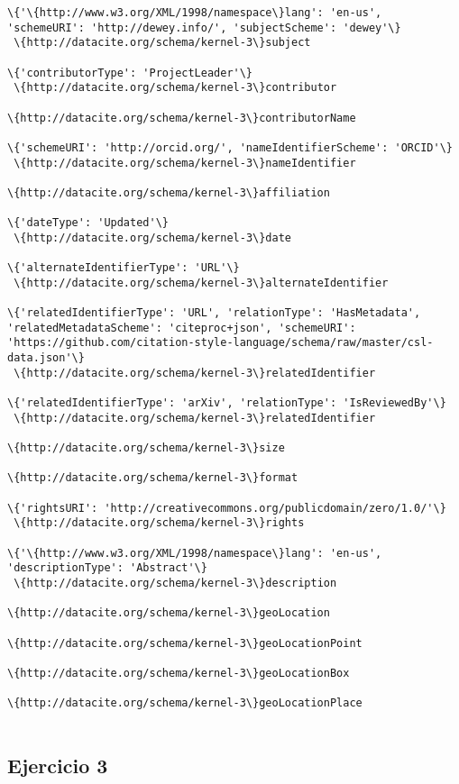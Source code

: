 \documentclass[11pt]{article}
\begin{document}
\begin{Verbatim}[commandchars=\\\{\}]
\{'\{http://www.w3.org/XML/1998/namespace\}lang': 'en-us', 'schemeURI': 'http://dewey.info/', 'subjectScheme': 'dewey'\} 
 \{http://datacite.org/schema/kernel-3\}subject 

\{'contributorType': 'ProjectLeader'\} 
 \{http://datacite.org/schema/kernel-3\}contributor 

\{http://datacite.org/schema/kernel-3\}contributorName 

\{'schemeURI': 'http://orcid.org/', 'nameIdentifierScheme': 'ORCID'\} 
 \{http://datacite.org/schema/kernel-3\}nameIdentifier 

\{http://datacite.org/schema/kernel-3\}affiliation 

\{'dateType': 'Updated'\} 
 \{http://datacite.org/schema/kernel-3\}date 

\{'alternateIdentifierType': 'URL'\} 
 \{http://datacite.org/schema/kernel-3\}alternateIdentifier 

\{'relatedIdentifierType': 'URL', 'relationType': 'HasMetadata', 'relatedMetadataScheme': 'citeproc+json', 'schemeURI': 'https://github.com/citation-style-language/schema/raw/master/csl-data.json'\} 
 \{http://datacite.org/schema/kernel-3\}relatedIdentifier 

\{'relatedIdentifierType': 'arXiv', 'relationType': 'IsReviewedBy'\} 
 \{http://datacite.org/schema/kernel-3\}relatedIdentifier 

\{http://datacite.org/schema/kernel-3\}size 

\{http://datacite.org/schema/kernel-3\}format 

\{'rightsURI': 'http://creativecommons.org/publicdomain/zero/1.0/'\} 
 \{http://datacite.org/schema/kernel-3\}rights 

\{'\{http://www.w3.org/XML/1998/namespace\}lang': 'en-us', 'descriptionType': 'Abstract'\} 
 \{http://datacite.org/schema/kernel-3\}description 

\{http://datacite.org/schema/kernel-3\}geoLocation 

\{http://datacite.org/schema/kernel-3\}geoLocationPoint 

\{http://datacite.org/schema/kernel-3\}geoLocationBox 

\{http://datacite.org/schema/kernel-3\}geoLocationPlace 


    \end{Verbatim}

    \hypertarget{ejercicio-3}{%
\subsection{Ejercicio 3}\label{ejercicio-3}}
\end{document}
